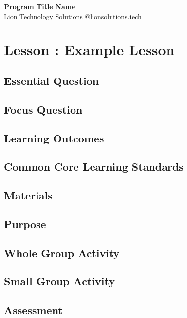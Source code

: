 \documentclass[a4paper, 11pt]{article}
\begin{document}
\vspace*{-0.75in}
\noindent\LARGE\textbf{Program Title} \hfill \textbf{Name} \\
\Large {Lion Technology Solutions} \hfill @lionsolutions.tech \\
\normalsize 

\section*{Lesson : Example Lesson}

\subsection*{Essential Question}


\subsection*{Focus Question}


\subsection*{Learning Outcomes}
 
 
\subsection*{Common Core Learning Standards}


\subsection*{Materials}


\subsection*{Purpose}


\subsection*{Whole Group Activity}


\subsection*{Small Group Activity}


\subsection*{Assessment}
\end{document}
